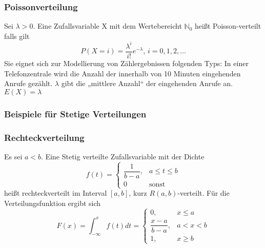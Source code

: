 \documentclass[
	ngerman,
	accentcolor=9c,%
	type=intern,
	marginpar=false
	]{tudapub}
\begin{document}
                \subsubsection*{Poissonverteilung}
                    Sei $\lambda > 0$.
                    Eine Zufallsvariable X mit dem Wertebereicht $\mathbb{N}_0$ heißt Poisson-verteilt falls gilt
                    \begin{equation*}
                        P(X=i) = \dfrac{\lambda^i}{i!}e^{-\lambda} \mbox{, } i = 0,1,2,\dots
                    \end{equation*}
                    Sie eignet sich zur Modellierung von Zählergebnissen folgenden Typs: In einer Telefonzentrale
                    wird die Anzahl der innerhalb von 10 Minuten eingehenden Anrufe gezählt. $\lambda$ gibt die „mittlere
                    Anzahl“ der eingehenden Anrufe an.\\
                    $E(X) = \lambda$
            \subsubsection{Beispiele für Stetige Verteilungen}
                \subsubsection*{Rechteckverteilung}
                    Es sei $a<b$. Eine Stetig verteilte Zufallsvariable mit der Dichte
                    \begin{equation*}
                        f(t)=
                        \begin{cases}
                            \dfrac{1}{b-a}, & a\leq t \leq b\\
                            0 & \text{sonst}
                        \end{cases}
                    \end{equation*}
                    heißt rechteckverteilt im Interval $[a,b]$, kurz $R(a,b)$-verteilt. Für die Verteilungsfunktion ergibt sich
                    \begin{equation*}
                        F(x)=\int_{- \infty}^x f(t) dt=
                        \begin{cases}
                            0, & x\leq a\\
                            \dfrac{x-a}{b-a}, & a < x < b\\
                            1,& x \geq b 
                        \end{cases}
                    \end{equation*}
\end{document}
